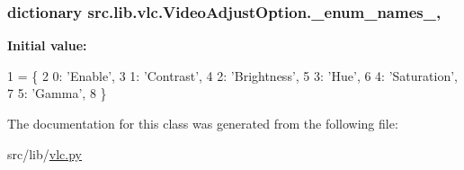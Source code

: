 \subsubsection[{\+\_\+enum\+\_\+names\+\_\+}]{\setlength{\rightskip}{0pt plus 5cm}dictionary src.\+lib.\+vlc.\+Video\+Adjust\+Option.\+\_\+enum\+\_\+names\+\_\+\hspace{0.3cm}{\ttfamily [static]}, {\ttfamily [private]}}\label{classsrc_1_1lib_1_1vlc_1_1VideoAdjustOption_aac7ce12bf5da69f9fc78c55cbeea76f4}
{\bfseries Initial value\+:}
\begin{DoxyCode}
1 = \{
2         0: \textcolor{stringliteral}{'Enable'},
3         1: \textcolor{stringliteral}{'Contrast'},
4         2: \textcolor{stringliteral}{'Brightness'},
5         3: \textcolor{stringliteral}{'Hue'},
6         4: \textcolor{stringliteral}{'Saturation'},
7         5: \textcolor{stringliteral}{'Gamma'},
8     \}
\end{DoxyCode}


The documentation for this class was generated from the following file\+:\begin{DoxyCompactItemize}
\item 
src/lib/\hyperlink{vlc_8py}{vlc.\+py}\end{DoxyCompactItemize}
